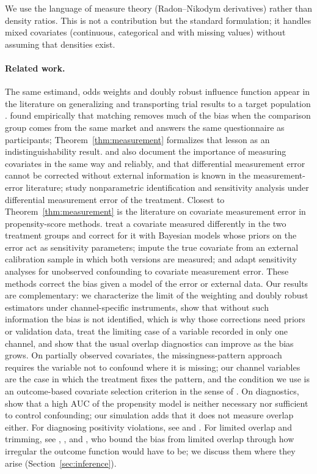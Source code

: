 \documentclass[twoside,11pt]{article}
\theoremstyle{plain}
\theoremstyle{definition}
\begin{document}
We use the language of measure theory (Radon--Nikodym derivatives) rather than density ratios. This is not a contribution but the standard formulation; it handles mixed covariates (continuous, categorical and with missing values) without assuming that densities exist.

\paragraph{Related work.} The same estimand, odds weights and doubly robust influence function appear in the literature on generalizing and transporting trial results to a target population \citep{dahabreh2019,westreich2017}. \citet{heckman1997} found empirically that matching removes much of the bias when the comparison group comes from the same market and answers the same questionnaire as participants; Theorem~\ref{thm:measurement} formalizes that lesson as an indistinguishability result. \citet{cook2008} and \citet{steiner2011} also document the importance of measuring covariates in the same way and reliably, and that differential measurement error cannot be corrected without external information is known in the measurement-error literature; \citet{imai2010} study nonparametric identification and sensitivity analysis under differential measurement error of the treatment. Closest to Theorem~\ref{thm:measurement} is the literature on covariate measurement error in propensity-score methods. \citet{hong2017} treat a covariate measured differently in the two treatment groups and correct for it with Bayesian models whose priors on the error act as sensitivity parameters; \citet{webbvargas2017} impute the true covariate from an external calibration sample in which both versions are measured; and \citet{rudolph2016} adapt sensitivity analyses for unobserved confounding to covariate measurement error. These methods correct the bias given a model of the error or external data. Our results are complementary: we characterize the limit of the weighting and doubly robust estimators under channel-specific instruments, show that without such information the bias is not identified, which is why those corrections need priors or validation data, treat the limiting case of a variable recorded in only one channel, and show that the usual overlap diagnostics can improve as the bias grows. On partially observed covariates, the missingness-pattern approach \citep{blake2020,dagostino2000} requires the variable not to confound where it is missing; our channel variables are the case in which the treatment fixes the pattern, and the condition we use is an outcome-based covariate selection criterion in the sense of \citet{deluna2011}. On diagnostics, \citet{westreich2011} show that a high AUC of the propensity model is neither necessary nor sufficient to control confounding; our simulation adds that it does not measure overlap either. For diagnosing positivity violations, see \citet{petersen2012} and \citet{damour2021}. For limited overlap and trimming, see \citet{crump2009}, \citet{ma2020,ma2023}, \citet{liu2023} and \citet{manamkoong2025}, who bound the bias from limited overlap through how irregular the outcome function would have to be; we discuss them where they arise (Section~\ref{sec:inference}).
\end{document}

